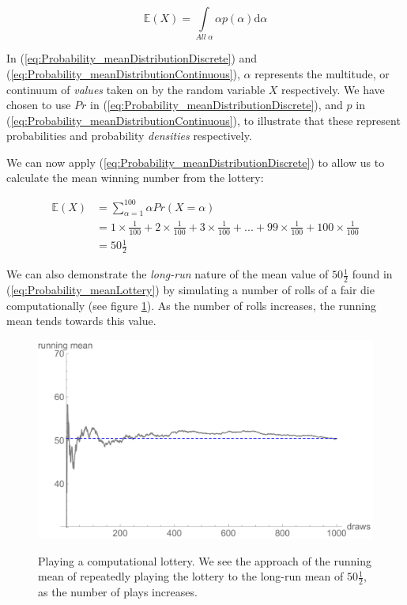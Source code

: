 \documentclass[11pt,fullpage]{book}
\begin{document}
\begin{equation}\label{eq:Probability_meanDistributionContinuous}
\mathbb{E}(X) = \int\limits_{All\; \alpha} \alpha p(\alpha)\mathrm{d}\alpha
\end{equation}

In (\ref{eq:Probability_meanDistributionDiscrete}) and (\ref{eq:Probability_meanDistributionContinuous}), $\alpha$ represents the multitude, or continuum of \textit{values} taken on by the random variable $X$ respectively.  We have chosen to use $Pr$ in (\ref{eq:Probability_meanDistributionDiscrete}), and $p$ in (\ref{eq:Probability_meanDistributionContinuous}), to illustrate that these represent probabilities and probability \textit{densities} respectively.

We can now apply (\ref{eq:Probability_meanDistributionDiscrete}) to allow us to calculate the mean winning number from the lottery:

\begin{equation}\label{eq:Probability_meanLottery}
\begin{align}
\mathbb{E}(X) &= \sum\limits_{\alpha=1}^{100} \alpha Pr(X=\alpha)\\
&= 1\times\frac{1}{100} +  2\times\frac{1}{100} +  3\times\frac{1}{100} + ... +  99\times\frac{1}{100} +  100\times\frac{1}{100}\\
&= 50\tfrac{1}{2}
\end{align}
\end{equation}

We can also demonstrate the \textit{long-run} nature of the mean value of $50\tfrac{1}{2}$ found in (\ref{eq:Probability_meanLottery}) by simulating a number of rolls of a fair die computationally (see figure \ref{fig:Probability_meanDiscreteLongRun}). As the number of rolls increases, the running mean tends towards this value.

\begin{figure}
\centering
\scalebox{0.55} 
{\includegraphics{Probability_meanDiscreteLongRun.pdf}}
\caption{Playing a computational lottery. We see the approach of the running mean of repeatedly playing the lottery to the long-run mean of $50\tfrac{1}{2}$, as the number of plays increases.}\label{fig:Probability_meanDiscreteLongRun}
\end{figure}
\end{document}
